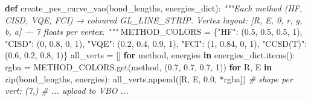 \documentclass[
  11pt,
]{report}
\newenvironment{Shaded}{}{}
\newcommand{\BuiltInTok}[1]{\textcolor[rgb]{0.00,0.50,0.00}{#1}}
\newcommand{\CommentTok}[1]{\textcolor[rgb]{0.38,0.63,0.69}{\textit{#1}}}
\newcommand{\ControlFlowTok}[1]{\textcolor[rgb]{0.00,0.44,0.13}{\textbf{#1}}}
\newcommand{\DecValTok}[1]{\textcolor[rgb]{0.25,0.63,0.44}{#1}}
\newcommand{\FloatTok}[1]{\textcolor[rgb]{0.25,0.63,0.44}{#1}}
\newcommand{\KeywordTok}[1]{\textcolor[rgb]{0.00,0.44,0.13}{\textbf{#1}}}
\newcommand{\NormalTok}[1]{#1}
\newcommand{\OperatorTok}[1]{\textcolor[rgb]{0.40,0.40,0.40}{#1}}
\newcommand{\StringTok}[1]{\textcolor[rgb]{0.25,0.44,0.63}{#1}}
\begin{document}
\begin{Shaded}
\begin{Highlighting}[]
\KeywordTok{def}\NormalTok{ create\_pes\_curve\_vao(bond\_lengths, energies\_dict):}
    \CommentTok{"""Each method (HF, CISD, VQE, FCI) → coloured GL\_LINE\_STRIP.}
\CommentTok{    Vertex layout: [R, E, 0, r, g, b, a] — 7 floats per vertex.}
\CommentTok{    """}
\NormalTok{    METHOD\_COLORS }\OperatorTok{=}\NormalTok{ \{}\StringTok{"HF"}\NormalTok{: (}\FloatTok{0.5}\NormalTok{, }\FloatTok{0.5}\NormalTok{, }\FloatTok{0.5}\NormalTok{, }\DecValTok{1}\NormalTok{), }\StringTok{"CISD"}\NormalTok{: (}\DecValTok{0}\NormalTok{, }\FloatTok{0.8}\NormalTok{, }\DecValTok{0}\NormalTok{, }\DecValTok{1}\NormalTok{),}
                     \StringTok{"VQE"}\NormalTok{: (}\FloatTok{0.2}\NormalTok{, }\FloatTok{0.4}\NormalTok{, }\FloatTok{0.9}\NormalTok{, }\DecValTok{1}\NormalTok{), }\StringTok{"FCI"}\NormalTok{: (}\DecValTok{1}\NormalTok{, }\FloatTok{0.84}\NormalTok{, }\DecValTok{0}\NormalTok{, }\DecValTok{1}\NormalTok{),}
                     \StringTok{"CCSD(T)"}\NormalTok{: (}\FloatTok{0.6}\NormalTok{, }\FloatTok{0.2}\NormalTok{, }\FloatTok{0.8}\NormalTok{, }\DecValTok{1}\NormalTok{)\}}
\NormalTok{    all\_verts }\OperatorTok{=}\NormalTok{ []}
    \ControlFlowTok{for}\NormalTok{ method, energies }\KeywordTok{in}\NormalTok{ energies\_dict.items():}
\NormalTok{        rgba }\OperatorTok{=}\NormalTok{ METHOD\_COLORS.get(method, (}\FloatTok{0.7}\NormalTok{, }\FloatTok{0.7}\NormalTok{, }\FloatTok{0.7}\NormalTok{, }\DecValTok{1}\NormalTok{))}
        \ControlFlowTok{for}\NormalTok{ R, E }\KeywordTok{in} \BuiltInTok{zip}\NormalTok{(bond\_lengths, energies):}
\NormalTok{            all\_verts.append([R, E, }\FloatTok{0.0}\NormalTok{, }\OperatorTok{*}\NormalTok{rgba])  }\CommentTok{\# shape per vert: (7,)}
    \CommentTok{\# ... upload to VBO ...}



\end{Highlighting}
\end{Shaded}
\end{document}
